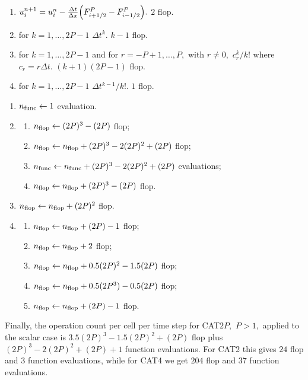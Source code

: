 \begin{enumerate}
\begin{enumerate}
        \item $ u_i^{n+1} = u_i^n - \frac{\Delta t}{\Delta x}\Bigl(F^P_{i+1/2} - F^P_{i-1/2}\Bigr).$ \; $2$ flop.
        
        \item for $k=1,\ldots,2P-1$ $\Delta t^k.$ \; $k-1$ flop.
        
        \item for $k=1,\ldots,2P-1$ and for $r = -P+1,\ldots,P,$ with $r\neq0,$ $c_r^k/k!$ where $c_r =r\Delta t.$ \; $(k+1)(2P-1)$ flop.
        
        \item for $k=1,\ldots,2P-1$ $\Delta t^{k-1}/k!.$ \; $1$ flop.        
    \end{enumerate} 
\end{enumerate}
\begin{enumerate}
    \item $n_{\rm func}\leftarrow1$ evaluation.
    \item\begin{enumerate}
        \item $n_{\rm flop}\leftarrow (2P)^3 - (2P)$ flop;
        \item $n_{\rm flop}\leftarrow n_{\rm flop} + (2P)^3 - 2(2P)^2 + (2P)$ flop;
        \item $n_{\rm func} \leftarrow n_{\rm func} +(2P)^3 - 2(2P)^2 + (2P)$ evaluations;
        \item $n_{\rm flop}\leftarrow n_{\rm flop} + (2P)^3 - (2P)$ flop.
    \end{enumerate}
    \item $n_{\rm flop}\leftarrow n_{\rm flop} + (2P)^2$ flop.
    \item\begin{enumerate}
        \item $n_{\rm flop}\leftarrow n_{\rm flop} + (2P)-1$ flop;
        \item $n_{\rm flop}\leftarrow n_{\rm flop} + 2$ flop;
        \item $n_{\rm flop}\leftarrow n_{\rm flop} + 0.5(2P)^2 - 1.5(2P)$ flop;
        \item $n_{\rm flop}\leftarrow n_{\rm flop} + 0.5(2P^3) - 0.5(2P)$ flop;
        \item $n_{\rm flop}\leftarrow n_{\rm flop} + (2P) - 1$ flop.
    \end{enumerate}
\end{enumerate}
Finally, the operation count per cell per time step for CAT$2P,$ $P>1,$ applied to the scalar case is $3.5(2P)^3 - 1.5(2P)^2 + (2P)$ flop plus $(2P)^3 - 2(2P)^2 + (2P) + 1$ function evaluations. For CAT2 this gives $24$ flop and $3$ function evaluations, while for CAT4 we get $204$ flop and $37$ function evaluations.


